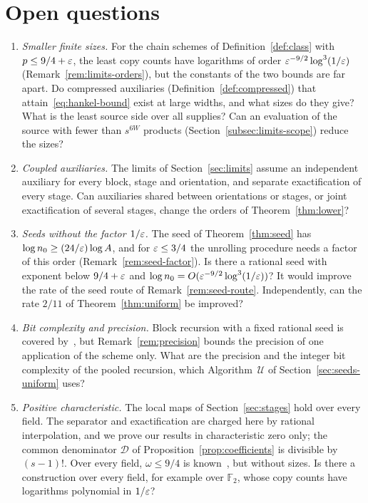 \section{Open questions}
\label{sec:open}

\begin{enumerate}
\item \emph{Smaller finite sizes.} For the chain schemes of
Definition~\ref{def:class} with \(p\le9/4+\varepsilon\), the least copy counts
have logarithms of order \(\varepsilon^{-9/2}\log^3(1/\varepsilon)\)
(Remark~\ref{rem:limits-orders}), but the constants of the two bounds
are far apart. Do compressed auxiliaries
(Definition~\ref{def:compressed}) that attain~\eqref{eq:hankel-bound}
exist at large widths, and what sizes do they give? What is the least
source side over all supplies? Can an evaluation of the source with
fewer than \(s^{6W}\) products (Section~\ref{subsec:limits-scope})
reduce the sizes?

\item \emph{Coupled auxiliaries.} The limits of
Section~\ref{sec:limits} assume an independent auxiliary for every block,
stage and orientation, and separate exactification of every stage. Can
auxiliaries shared between orientations or stages, or joint
exactification of several stages, change the orders of
Theorem~\ref{thm:lower}?

\item \emph{Seeds without the factor \(1/\varepsilon\).} The seed of
Theorem~\ref{thm:seed} has \(\log n_0\ge(24/\varepsilon)\log A\), and for
\(\varepsilon\le3/4\) the unrolling procedure needs a factor of this order
(Remark~\ref{rem:seed-factor}). Is there a rational seed with exponent
below \(9/4+\varepsilon\) and \(\log n_0=O(\varepsilon^{-9/2}\log^3(1/\varepsilon))\)? It
would improve the rate of the seed route of
Remark~\ref{rem:seed-route}. Independently, can the rate \(2/11\) of
Theorem~\ref{thm:uniform} be improved?

\item \emph{Bit complexity and precision.} Block recursion with a fixed
rational seed is covered by~\citep[Lemma~9.4 and
Propositions~9.5--9.6]{FinCon26}, but Remark~\ref{rem:precision} bounds
the precision of one application of the scheme only. What are the
precision and the integer bit complexity of the pooled recursion, which
Algorithm~\(\mathcal U\) of Section~\ref{sec:seeds-uniform} uses?

\item \emph{Positive characteristic.} The local maps of
Section~\ref{sec:stages} hold over every field. The separator and
exactification are charged here by rational interpolation, and we prove
our results in characteristic zero only; the common denominator
\(\mathcal D\) of Proposition~\ref{prop:coefficients} is divisible by
\((s-1)!\). Over every field, \(\omega\le9/4\) is
known~\citep{Nav26a,Zui26,Fil26}, but without sizes. Is there a
construction over every field, for example over \(\mathbb F_2\), whose
copy counts have logarithms polynomial in \(1/\varepsilon\)?


\end{enumerate}
